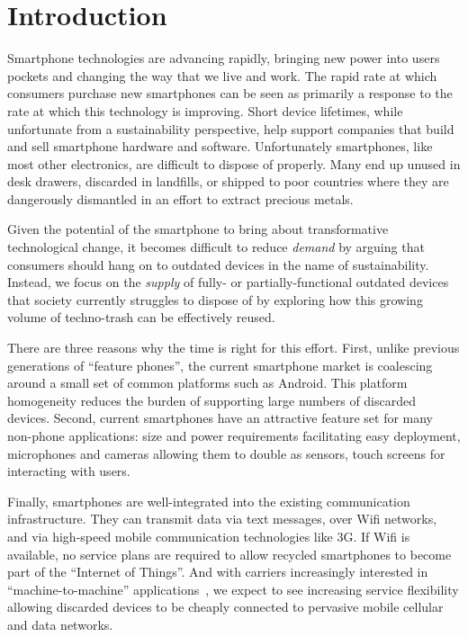 \section{Introduction}

Smartphone technologies are advancing rapidly, bringing new power into users
pockets and changing the way that we live and work. The rapid rate at which
consumers purchase new smartphones can be seen as primarily a response to the
rate at which this technology is improving. Short device lifetimes, while
unfortunate from a sustainability perspective, help support companies that
build and sell smartphone hardware and software. Unfortunately smartphones,
like most other electronics, are difficult to dispose of properly. Many end
up unused in desk drawers, discarded in landfills, or shipped to poor
countries where they are dangerously dismantled in an effort to extract
precious metals.

Given the potential of the smartphone to bring about transformative
technological change, it becomes difficult to reduce \textit{demand} by
arguing that consumers should hang on to outdated devices in the name of
sustainability. Instead, we focus on the \textit{supply} of fully- or
partially-functional outdated devices that society currently struggles to
dispose of by exploring how this growing volume of techno-trash can be
effectively reused.

There are three reasons why the time is right for this effort. First, unlike
previous generations of ``feature phones'', the current smartphone market is
coalescing around a small set of common platforms such as Android. This
platform homogeneity reduces the burden of supporting large numbers of
discarded devices. Second, current smartphones have an attractive feature set
for many non-phone applications: size and power requirements facilitating
easy deployment, microphones and cameras allowing them to double as sensors,
touch screens for interacting with users.

Finally, smartphones are well-integrated into the existing communication
infrastructure. They can transmit data via text messages, over Wifi networks,
and via high-speed mobile communication technologies like 3G. If Wifi is
available, no service plans are required to allow recycled smartphones to
become part of the ``Internet of Things''. And with carriers increasingly
interested in ``machine-to-machine'' applications~\cite{sprint-m2m}, we
expect to see increasing service flexibility allowing discarded devices to be
cheaply connected to pervasive mobile cellular and data networks.

